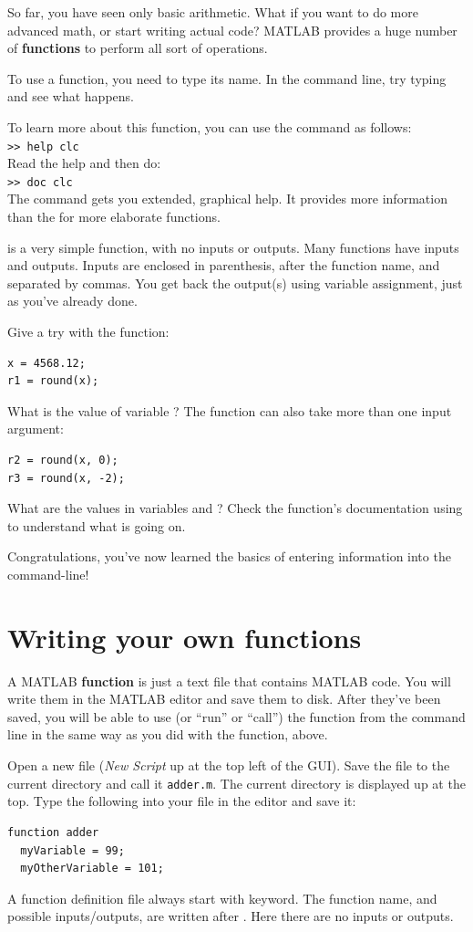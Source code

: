 \documentclass{article}
\begin{document}
So far, you have seen only basic arithmetic.
What if you want to do more advanced math, or start writing actual code?
MATLAB provides a huge number of \textbf{functions} to perform all sort of operations.

To use a function, you need to type its name.
In the command line, try typing  and see what happens.

To learn more about this function, you can use the  command as follows: \\
\verb|>> help clc| \\
Read the help and then do:\\
\verb|>> doc clc| \\
The  command gets you extended, graphical help. It provides more information than the  for more elaborate functions.


 is a very simple function, with no inputs or outputs.
Many functions have inputs and outputs.
Inputs are enclosed in parenthesis, after the function name, and separated by commas.
You get back the output(s) using variable assignment, just as you've already done.

Give a try with the  function:
\begin{lstlisting}
x = 4568.12;
r1 = round(x);
\end{lstlisting}
What is the value of variable ? The  function can also take more than one input argument:
\begin{lstlisting}
r2 = round(x, 0);
r3 = round(x, -2);
\end{lstlisting}
What are the values in variables  and ?
Check the function's documentation using  to understand what is going on.

Congratulations, you've now learned the basics of entering information into the command-line!


\section{Writing your own functions}

A MATLAB \textbf{function} is just a text file that contains MATLAB code.
You will write them in the MATLAB editor and save them to disk.
After they've been saved, you will be able to use (or ``run'' or ``call'') the function from the command line in the same way as you did with the  function, above.

Open a new file (\emph{New Script} up at the top left of the GUI).
Save the file to the current directory and call it \verb|adder.m|.
The current directory is displayed up at the top.
Type the following into your file in the editor and save it:
\begin{lstlisting}
function adder
  myVariable = 99;
  myOtherVariable = 101;
\end{lstlisting}
A function definition file always start with  keyword.
The function name, and possible inputs/outputs, are written after .
Here there are no inputs or outputs.
\end{document}
